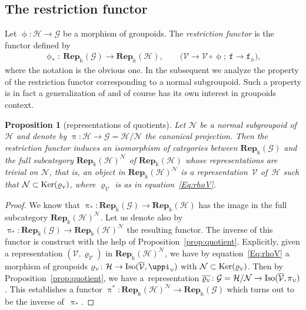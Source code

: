 \documentclass[10pt,a4paper]{amsart}
\numberwithin{equation}{section}
\newtheorem{Proposition}[Theorem]{Proposition}
 { \theoremstyle{definition}
\newtheorem{Definition}[Theorem]{Definition}
\newtheorem{Remark}[Theorem]{Remark}
\newtheorem{Example}[Theorem]{Example}
 }
\newcommand{\bara}[1]{\overline{#1}}
\newcommand{\Rep}[1]{\mathbf{Rep}_{\Sscript{\Bbbk}}(#1)}
\newcommand{\tF}{\texttt{f}}
\newcommand{\phil}{\upphi_{\Sscript{*}}}
\newcommand{\Ker}[1]{{\rm Ker}(#1)}
\newcommand{\cG}{{\mathcal G}}
\newcommand{\cH}{{\mathcal H}}
\newcommand{\cN}{{\mathcal N}}
\newcommand{\cV}{{\mathcal V}}
\newcommand{\Sscript}[1]{\scriptscriptstyle{#1}}
\begin{document}
\subsection{The restriction functor}\label{ssec:Res}
Let $\upphi\colon \cH \to \cG$ be a morphism of groupoids. The \emph{restriction functor} is the functor defined by
\begin{gather}\label{Eq:restriction}
\phil\colon \ \Rep{\cG} \longrightarrow \Rep{\cH}, \qquad \big( \cV\longrightarrow \cV \circ \upphi;\ \tF \longrightarrow\tF_{\Sscript{\upphi}} \big),
\end{gather}
where the notation is the obvious one. In the subsequent we analyze the property of the restriction functor corresponding to a normal subgroupoid. Such a property is in fact a generalization of \cite[Proposition~2.3.2]{Kowalski:2014} and of course has its own interest in groupoids context.

\begin{Proposition}[representations of quotients]\label{prop:Res} Let $\cN$ be a normal subgroupoid of $\cH$ and denote by $\uppi\colon \cH \to \cG=\cH/\cN$ the canonical projection. Then the restriction functor induces an isomorphism of categories between $\Rep{\cG}$ and the full subcategory $\Rep{\cH}^{\Sscript{\cN}}$ of $\Rep{\cH}$ whose representations are trivial on $\cN$, that is, an object in $\Rep{\cH}^{\Sscript{\cN}}$ is a representation~$\cV$ of~$\cH$ such that $\cN \subset \Ker{\varrho_{\Sscript{\cV}}}$, where $\varrho_{\Sscript{\cV}}$ is as in equation~\eqref{Eq:rhoV}.
\end{Proposition}
\begin{proof}We know that $\uppi_{*}\colon \Rep{\cG} \!\to\! \Rep{\cH}$ has the image in the full subcategory $\Rep{\cH}^{\Sscript{\cN}}\!$. Let us denote also by $\uppi_{*}\colon \Rep{\cG} \to \Rep{\cH}^{\Sscript{\cN}}$ the resulting functor. The inverse of this functor is construct with the help of Proposition~\ref{prop:quotient}. Explicitly, given a representation $(\cV, \varrho_{\Sscript{\cV}})$ in $\Rep{\cH}^{\Sscript{\cN}}$, we have by equation~\eqref{Eq:rhoV} a morphism of groupoids $\varrho_{\Sscript{\cV}}\colon \cH \to {\rm Iso}(\bara{\cV}, \uppi_{\Sscript{\cV}})$ with $\cN \subset \Ker{\varrho_{\Sscript{\cV}}}$. Then by Proposition~\ref{prop:quotient}, we have a~representation $\bara{\varrho_{\Sscript{\cV}}}\colon \cG=\cH/\cN \to {\rm Iso}(\bara{\cV}, \pi_{\Sscript{\cV}})$. This establishes a functor $\uppi^{*}\colon \Rep{\cH}^{\Sscript{\cN}} \to
\Rep{\cG}$ which turns out to be the inverse of~$\uppi_{*}$.
\end{proof}
\end{document}
